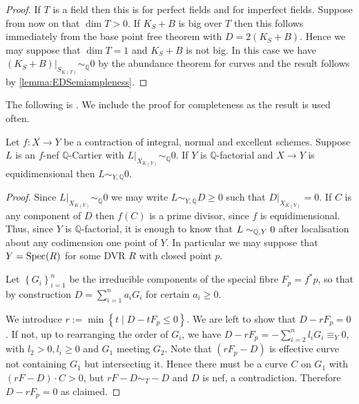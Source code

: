 	\begin{proof}	
		If $T$ is a field then this is \cite[Theorem 1.2]{fujino2012log} for perfect fields and \cite{tanaka2020abundance} for imperfect fields. 
		Suppose from now on that $\dim T > 0$.
		If $K_{S}+B$ is big over $T$ then this follows immediately from the base point free theorem \cite[Theorem 4.2]{Tan18} with $D=2(K_{S}+B)$. Hence we may suppose that $\dim T=1$ and $K_{S}+B$ is not big. In this case we have $(K_{S}+B)|_{S_{K(T)}} \sim_{\mathbb{Q}} 0$ by the abundance theorem for curves and the result follows by \autoref{lemma:EDSemiampleness}. 
	\end{proof}
	
	The following is \cite[Lemma 2.17]{cascini2020relative}. We include the proof for completeness as the result is used often.
	
	
	\begin{lemma}\label{lemma:EDSemiampleness}
		Let $f\colon X \to Y$ be a contraction of integral, normal and excellent schemes. Suppose $L$ is an $f$-nef $\mathbb{Q}$-Cartier with $L|_{X_{K(Y)}} \sim_{\mathbb{Q}} 0$. If $Y$ is $\mathbb{Q}$-factorial and $X \to Y$ is equidimensional then $L \sim_{Y,\mathbb{Q}} 0$.
	\end{lemma}
	
	\begin{proof}
		Since $L|_{X_{K(Y)}} \sim_{\mathbb{Q}} 0$ we may write $L\sim_{Y, \mathbb{Q}} D\geq 0$ such that $D|_{X_{K(Y)}}=0$. If $C$ is any component of $D$ then $f(C)$ is a prime divisor, since $f$ is equidimensional. Thus, since $Y$ is $\mathbb{Q}$-factorial, it is enough to know that $L \sim_{\mathbb{Q},Y} 0$ after localisation about any codimension one point of $Y$. In particular we may suppose that $Y= \operatorname{Spec} (R)$ for some DVR $R$ with closed point $p$.
		
		Let $\left\{G_i \right\}_{i=1}^n$ be the irreducible components of the special fibre $F_p=f^*p$, so that by construction $D = \sum_{i=1}^n a_i G_i$ for certain $a_i \geq 0$.	
		
		We introduce $r:= \min \left\{ t \mid D -tF_p \leq 0 \right\}$. We are left to show that $D-rF_p=0$. 
		If not, up to rearranging the order of $G_i$, we have $D-rF_p=-\sum_{i=2}^n l_i G_i \equiv_Y 0$, with $l_2 >0, l_i \geq 0$ and $G_{1}$ meeting $G_{2}$. Note that $(rF_p-D)$ is effective curve not containing $G_{1}$ but intersecting it. Hence there must be a curve $C$ on $G_{1}$ with $(rF-D) \cdot C >0$, but $rF-D \sim_{T} -D$ and $D$ is nef, a contradiction. Therefore $D-rF_p=0$ as claimed.
	\end{proof}
	

